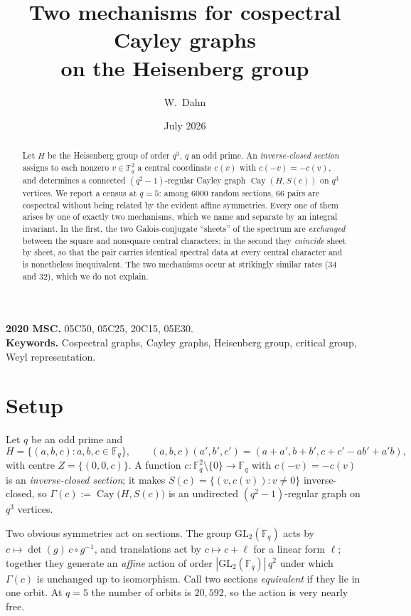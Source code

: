 \documentclass[11pt]{article}
\title{Two mechanisms for cospectral Cayley graphs\\ on the Heisenberg group}
\author{W.~Dahn}
\date{July 2026}
\theoremstyle{plain}
\theoremstyle{definition}
\newcommand{\FF}{\mathbb F}
\newcommand{\Cay}{\operatorname{Cay}}
\begin{document}
\maketitle

\begin{abstract}
\noindent Let $H$ be the Heisenberg group of order $q^3$, $q$ an odd prime. An
\emph{inverse-closed section} assigns to each nonzero $v\in\FF_q^2$ a central
coordinate $c(v)$ with $c(-v)=-c(v)$, and determines a connected
$(q^2-1)$-regular Cayley graph $\Cay(H,S(c))$ on $q^3$ vertices. We report a
census at $q=5$: among $6000$ random sections, $66$ pairs are cospectral
without being related by the evident affine symmetries. Every one of them
arises by one of exactly two mechanisms, which we name and separate by an
integral invariant. In the first, the two Galois-conjugate ``sheets'' of the
spectrum are \emph{exchanged} between the square and nonsquare central
characters; in the second they \emph{coincide} sheet by sheet, so that the
pair carries identical spectral data at every central character and is
nonetheless inequivalent. The two mechanisms occur at strikingly similar
rates ($34$ and $32$), which we do not explain.
\end{abstract}

\noindent\textbf{2020 MSC.} 05C50, 05C25, 20C15, 05E30.\\
\textbf{Keywords.} Cospectral graphs, Cayley graphs, Heisenberg group,
critical group, Weyl representation.

\section{Setup}

Let $q$ be an odd prime and
\[
H=\{(a,b,c):a,b,c\in\FF_q\},\qquad
(a,b,c)(a',b',c')=(a+a',b+b',c+c'-ab'+a'b),
\]
with centre $Z=\{(0,0,c)\}$. A function
$c:\FF_q^2\setminus\{0\}\to\FF_q$ with $c(-v)=-c(v)$ is an \emph{inverse-closed
section}; it makes
$S(c)=\{(v,c(v)):v\neq0\}$ inverse-closed, so
$\Gamma(c):=\Cay\bigl(H,S(c)\bigr)$
is an undirected $(q^2-1)$-regular graph on $q^3$ vertices.

Two obvious symmetries act on sections. The group $\mathrm{GL}_2(\FF_q)$ acts by
$c\mapsto\det(g)\,c\circ g^{-1}$, and translations act by
$c\mapsto c+\ell$ for a linear form $\ell$; together they generate an
\emph{affine} action of order $|\mathrm{GL}_2(\FF_q)|\,q^2$ under which
$\Gamma(c)$ is unchanged up to isomorphism. Call two sections
\emph{equivalent} if they lie in one orbit. At $q=5$ the number of orbits is
$20{,}592$, so the action is very nearly free.
\end{document}
